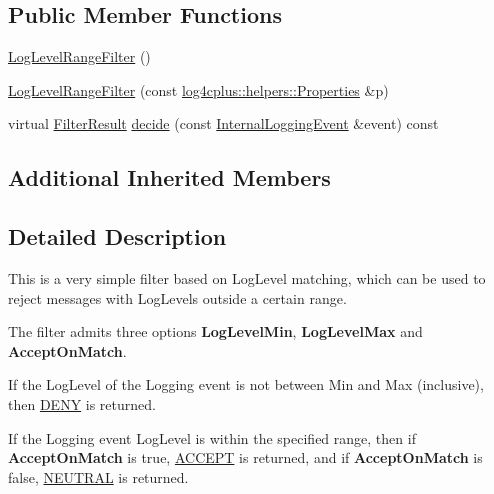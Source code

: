 \subsection*{Public Member Functions}
\begin{DoxyCompactItemize}
\item 
\hyperlink{classlog4cplus_1_1spi_1_1LogLevelRangeFilter_a377601d952658e498ff6c6216698153e}{Log\-Level\-Range\-Filter} ()
\item 
\hyperlink{classlog4cplus_1_1spi_1_1LogLevelRangeFilter_abb3af1a64ce6cc2ddc4f417d435c2117}{Log\-Level\-Range\-Filter} (const \hyperlink{classlog4cplus_1_1helpers_1_1Properties}{log4cplus\-::helpers\-::\-Properties} \&p)
\item 
virtual \hyperlink{namespacelog4cplus_1_1spi_aa910f475d36c00f943ef78e37d11e3f6}{Filter\-Result} \hyperlink{classlog4cplus_1_1spi_1_1LogLevelRangeFilter_a5c22fc312173f06abd729961933f30c8}{decide} (const \hyperlink{classlog4cplus_1_1spi_1_1InternalLoggingEvent}{Internal\-Logging\-Event} \&event) const 
\end{DoxyCompactItemize}
\subsection*{Additional Inherited Members}


\subsection{Detailed Description}
This is a very simple filter based on Log\-Level matching, which can be used to reject messages with Log\-Levels outside a certain range.

The filter admits three options {\bfseries Log\-Level\-Min}, {\bfseries Log\-Level\-Max} and {\bfseries Accept\-On\-Match}.

If the Log\-Level of the Logging event is not between Min and Max (inclusive), then \hyperlink{namespacelog4cplus_1_1spi_aa910f475d36c00f943ef78e37d11e3f6a4782fd85324c15b37a4de87628f51634}{D\-E\-N\-Y} is returned.

If the Logging event Log\-Level is within the specified range, then if {\bfseries Accept\-On\-Match} is true, \hyperlink{namespacelog4cplus_1_1spi_aa910f475d36c00f943ef78e37d11e3f6a222b6ce4c30f1d7d9164b901bb2907a7}{A\-C\-C\-E\-P\-T} is returned, and if {\bfseries Accept\-On\-Match} is false, \hyperlink{namespacelog4cplus_1_1spi_aa910f475d36c00f943ef78e37d11e3f6ae75ab2e37a542c14fe57be606502a550}{N\-E\-U\-T\-R\-A\-L} is returned.

